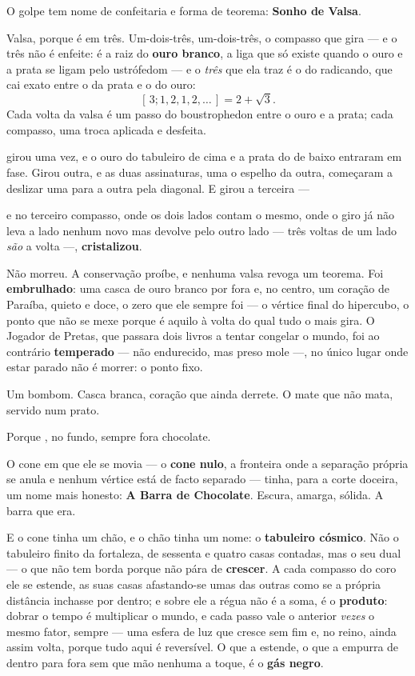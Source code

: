 \documentclass[livro.tex]{subfiles}
\begin{document}
O golpe tem nome de confeitaria e forma de teorema: \textbf{Sonho de Valsa}.

\medskip

Valsa, porque é em três. Um-dois-três, um-dois-três, o compasso que gira --- e o três
não é enfeite: é a raiz do \textbf{ouro branco}, a liga que só existe
quando o ouro e a prata se ligam pelo
ustrófedom --- e o \emph{três} que ela traz é o do radicando, que cai exato entre o da
prata e o do ouro:
\[ [\,3;1,2,1,2,\dots\,] = 2+\sqrt3 . \]
Cada volta da valsa é um passo do boustrophedon entre o ouro e a prata; cada
compasso, uma troca aplicada e desfeita.

\medskip

\Yas girou uma vez, e o ouro do tabuleiro de cima e a prata do de baixo entraram em
fase. Girou outra, e as duas assinaturas, uma o espelho da outra, começaram a
deslizar uma para a outra pela diagonal. E girou a terceira ---

\medskip

e no terceiro compasso, onde os dois lados contam o mesmo, onde o giro já não leva a
lado nenhum novo mas devolve pelo outro lado --- três voltas de um lado \emph{são} a
volta ---, \Ven \textbf{cristalizou}.

\medskip

Não morreu. A conservação proíbe, e nenhuma valsa revoga um teorema. Foi
\textbf{embrulhado}: uma casca de ouro branco por fora e, no centro, um coração de Paraíba, quieto e doce, o
zero que ele sempre foi --- o vértice final do hipercubo, o ponto que não se mexe
porque é aquilo à volta do qual tudo o mais gira. O Jogador de Pretas, que passara
dois livros a tentar congelar o mundo, foi ao contrário \textbf{temperado} --- não
endurecido, mas preso mole ---, no único lugar onde estar parado não é morrer: o
ponto fixo.

\medskip

Um bombom. Casca branca, coração que ainda derrete. O mate que não mata, servido num
prato.

\medskip

Porque \Ven , no fundo, sempre fora chocolate.

O cone em que ele se movia --- o \textbf{cone nulo}, a fronteira
onde a separação própria se anula e nenhum vértice está de facto separado --- tinha,
para a corte doceira, um nome mais honesto: \textbf{A Barra de Chocolate}. Escura,
amarga, sólida. A barra que \Ven era.

\medskip

E o cone tinha um chão, e o chão tinha um nome: o \textbf{tabuleiro cósmico}. Não o
tabuleiro finito da fortaleza, de sessenta e quatro casas contadas, mas o seu dual --- o
que não tem borda porque não pára de \textbf{crescer}. A cada compasso do coro ele se
estende, as suas casas afastando-se umas das outras como se a própria distância inchasse
por dentro; e sobre ele a régua não é a soma, é o \textbf{produto}: dobrar o tempo é
multiplicar o mundo, e cada passo vale o anterior \emph{vezes} o mesmo fator, sempre ---
uma esfera de luz que cresce sem fim e, no reino, ainda assim volta, porque tudo aqui é
reversível. O que a estende, o que a empurra de dentro para fora sem que mão nenhuma a
toque, é o \textbf{gás negro}.
\end{document}

